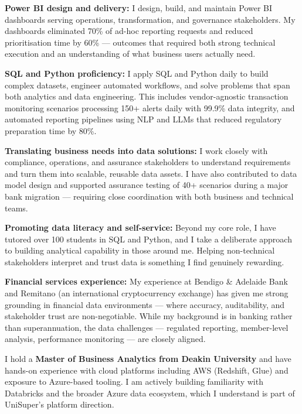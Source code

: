 \documentclass[11pt, a4paper]{article}
\begin{document}
\textbf{Power BI design and delivery:}
I design, build, and maintain Power BI dashboards serving operations, transformation, and governance stakeholders. My dashboards eliminated 70\% of ad-hoc reporting requests and reduced prioritisation time by 60\% --- outcomes that required both strong technical execution and an understanding of what business users actually need.

\textbf{SQL and Python proficiency:}
I apply SQL and Python daily to build complex datasets, engineer automated workflows, and solve problems that span both analytics and data engineering. This includes vendor-agnostic transaction monitoring scenarios processing 150+ alerts daily with 99.9\% data integrity, and automated reporting pipelines using NLP and LLMs that reduced regulatory preparation time by 80\%.

\textbf{Translating business needs into data solutions:}
I work closely with compliance, operations, and assurance stakeholders to understand requirements and turn them into scalable, reusable data assets. I have also contributed to data model design and supported assurance testing of 40+ scenarios during a major bank migration --- requiring close coordination with both business and technical teams.

\textbf{Promoting data literacy and self-service:}
Beyond my core role, I have tutored over 100 students in SQL and Python, and I take a deliberate approach to building analytical capability in those around me. Helping non-technical stakeholders interpret and trust data is something I find genuinely rewarding.

\textbf{Financial services experience:}
My experience at Bendigo \& Adelaide Bank and Remitano (an international cryptocurrency exchange) has given me strong grounding in financial data environments --- where accuracy, auditability, and stakeholder trust are non-negotiable. While my background is in banking rather than superannuation, the data challenges --- regulated reporting, member-level analysis, performance monitoring --- are closely aligned.

I hold a \textbf{Master of Business Analytics from Deakin University} and have hands-on experience with cloud platforms including AWS (Redshift, Glue) and exposure to Azure-based tooling. I am actively building familiarity with Databricks and the broader Azure data ecosystem, which I understand is part of UniSuper's platform direction.
\end{document}
